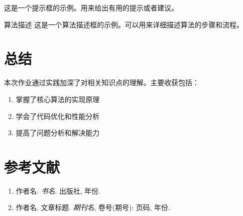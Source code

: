 \documentclass[12pt,a4paper]{article}
\numberwithin{equation}{section}
\newcommand{\hint}[1]{\begin{tcolorbox}[colback=accentblue!10,colframe=accentblue,title=提示,fonttitle=\bfseries\color{white},sharp corners]#1\end{tcolorbox}}
\begin{document}
\hint{这是一个提示框的示例。用来给出有用的提示或者建议。}

\begin{algorithmbox}{算法描述}
这是一个算法描述框的示例。可以用来详细描述算法的步骤和流程。
\end{algorithmbox}

\section{总结}

本次作业通过实践加深了对相关知识点的理解。主要收获包括：

\begin{enumerate}[leftmargin=20pt]
    \item 掌握了核心算法的实现原理
    \item 学会了代码优化和性能分析
    \item 提高了问题分析和解决能力
\end{enumerate}

\section*{参考文献}

\begin{enumerate}
    \item 作者名. \textit{书名}. 出版社, 年份.
    \item 作者名. 文章标题. \textit{期刊名}, 卷号(期号): 页码, 年份.
\end{enumerate}
\end{document}
